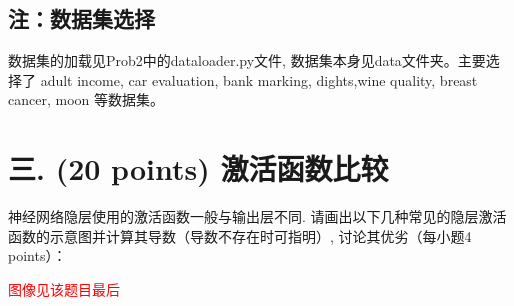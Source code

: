 \documentclass[8pt]{article}
\begin{document}
\subsection*{注：数据集选择}

数据集的加载见Prob2中的dataloader.py文件, 数据集本身见data文件夹。主要选择了 adult income, car evaluation, bank marking, dights,wine quality, breast cancer, moon 等数据集。

\vspace{3em}

\section*{三. (20 points) 激活函数比较}
神经网络隐层使用的激活函数一般与输出层不同. 请画出以下几种常见的隐层激活函数的示意图并计算其导数（导数不存在时可指明）, 讨论其优劣（每小题4 points）：

\textcolor{red}{图像见该题目最后}
\end{document}
